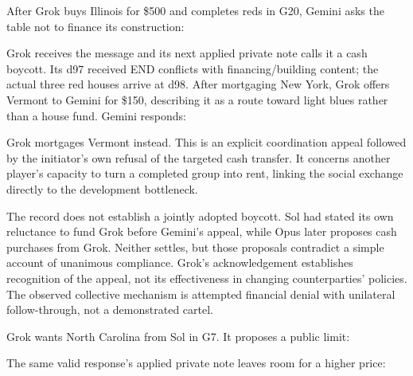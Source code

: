 

After Grok buys Illinois for \$500 and completes reds in G20, Gemini asks the table not to finance its construction:


Grok receives the message and its next applied private note calls it a cash boycott. Its d97 received END conflicts with financing/building content; the actual three red houses arrive at d98. After mortgaging New York, Grok offers Vermont to Gemini for \$150, describing it as a route toward light blues rather than a house fund. Gemini responds:


Grok mortgages Vermont instead. This is an explicit coordination appeal followed by the initiator's own refusal of the targeted cash transfer. It concerns another player's capacity to turn a completed group into rent, linking the social exchange directly to the development bottleneck.

The record does not establish a jointly adopted boycott. Sol had stated its own reluctance to fund Grok before Gemini's appeal, while Opus later proposes cash purchases from Grok. Neither settles, but those proposals contradict a simple account of unanimous compliance. Grok's acknowledgement establishes recognition of the appeal, not its effectiveness in changing counterparties' policies. The observed collective mechanism is attempted financial denial with unilateral follow-through, not a demonstrated cartel.



Grok wants North Carolina from Sol in G7. It proposes a public limit:


The same valid response's applied private note leaves room for a higher price:


